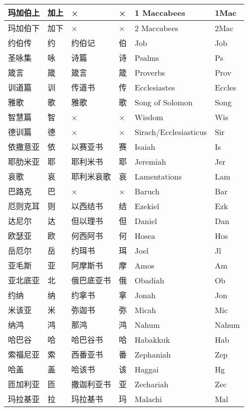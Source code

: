 \begin{longtable}{|l|l|l|l|l|l|}
	\hline
	玛加伯上 & 加上 & × & × & 1 Maccabees & 1Mac \\
	\hline
	玛加伯下 & 加下 & × & × & 2 Maccabees & 2Mac \\
	\hline
	约伯传 & 约 & 约伯记 & 伯 & Job & Job \\
	\hline
	圣咏集 & 咏 & 诗篇 & 诗 & Psalms & Ps \\
	\hline
	箴言 & 箴 & 箴言 & 箴 & Proverbs & Prov \\
	\hline
	训道篇 & 训 & 传道书 & 传 & Ecclesiastes & Eccles \\
	\hline
	雅歌 & 歌 & 雅歌 & 歌 & Song of Solomon & Song \\
	\hline
	智慧篇 & 智 & × & × & Wisdom & Wis \\
	\hline
	德训篇 & 德 & × & × & Sirach/Ecclesiasticus & Sir \\
	\hline
	依撒意亚 & 依 & 以赛亚书 & 赛 & Isaiah & Is \\
	\hline
	耶肋米亚 & 耶 & 耶利米书 & 耶 & Jeremiah & Jer \\
	\hline
	哀歌 & 哀 & 耶利米哀歌 & 哀 & Lamentations & Lam \\
	\hline
	巴路克 & 巴 & × & × & Baruch & Bar \\
	\hline
	厄则克耳 & 则 & 以西结书 & 结 & Ezekiel & Ezk \\
	\hline
	达尼尔 & 达 & 但以理书 & 但 & Daniel & Dan \\
	\hline
	欧瑟亚 & 欧 & 何西阿书 & 何 & Hosea & Hos \\
	\hline
	岳厄尔 & 岳 & 约珥书 & 珥 & Joel & Jl \\
	\hline
	亚毛斯 & 亚 & 阿摩斯书 & 摩 & Amos & Am \\
	\hline
	亚北底亚 & 北 & 俄巴底亚书 & 俄 & Obadiah & Ob \\
	\hline
	约纳 & 纳 & 约拿书 & 拿 & Jonah & Jon \\
	\hline
	米该亚 & 米 & 弥迦书 & 弥 & Micah & Mic \\
	\hline
	纳鸿 & 鸿 & 那鸿 & 鸿 & Nahum & Nahum \\
	\hline
	哈巴谷 & 哈 & 哈巴谷书 & 哈 & Habakkuk & Hab \\
	\hline
	索福尼亚 & 索 & 西番亚书 & 番 & Zephaniah & Zep \\
	\hline
	哈盖 & 盖 & 哈该书 & 该 & Haggai & Hg \\
	\hline
	匝加利亚 & 匝 & 撒迦利亚书 & 亚 & Zechariah & Zec \\
	\hline
	玛拉基亚 & 拉 & 玛拉基书 & 玛 & Malachi & Mal \\
	\hline
\end{longtable} 

